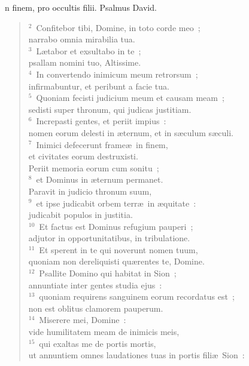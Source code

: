 \bchapter
{}n finem, pro occultis filii. Psalmus David.
\begin{flushleft}\begin{verse}\vspace{6pt}${}^{2}$~Confitebor tibi, Domine, in toto corde meo~;\\ narrabo omnia mirabilia tua.\\
${}^{3}$~L\ae tabor et exsultabo in te~;\\ psallam nomini tuo, Altissime.\\
${}^{4}$~In convertendo inimicum meum retrorsum~;\\ infirmabuntur, et peribunt a facie tua.\\
${}^{5}$~Quoniam fecisti judicium meum et causam meam~;\\ sedisti super thronum, qui judicas justitiam.\\
${}^{6}$~Increpasti gentes, et periit impius~:\\ nomen eorum delesti in \ae ternum, et in s\ae culum s\ae culi.\\
${}^{7}$~Inimici defecerunt frame\ae\ in finem,\\ et civitates eorum destruxisti.\\ Periit memoria eorum cum sonitu~;\\
${}^{8}$~et Dominus in \ae ternum permanet.\\ Paravit in judicio thronum suum,\\
${}^{9}$~et ipse judicabit orbem terr\ae\ in \ae quitate~:\\ judicabit populos in justitia.\\
${}^{10}$~Et factus est Dominus refugium pauperi~;\\ adjutor in opportunitatibus, in tribulatione.\\
${}^{11}$~Et sperent in te qui noverunt nomen tuum,\\ quoniam non dereliquisti qu\ae rentes te, Domine.\\
${}^{12}$~Psallite Domino qui habitat in Sion~;\\ annuntiate inter gentes studia ejus~:\\
${}^{13}$~quoniam requirens sanguinem eorum recordatus est~;\\ non est oblitus clamorem pauperum.\\
${}^{14}$~Miserere mei, Domine~:\\ vide humilitatem meam de inimicis meis,\\
${}^{15}$~qui exaltas me de portis mortis,\\ ut annuntiem omnes laudationes tuas in portis fili\ae\ Sion~:\\

\end{verse}
\end{flushleft}
